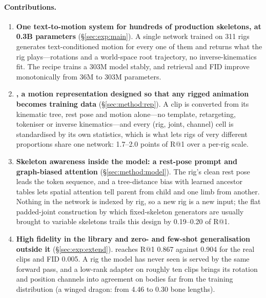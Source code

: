 \paragraph{Contributions.}
\begin{enumerate}[leftmargin=*,itemsep=1pt,topsep=2pt]
\item \textbf{One text-to-motion system for hundreds of production skeletons, at 0.3B parameters}
  (\S\ref{sec:exp:main}). A single network trained on \num{311} rigs generates text-conditioned motion for
  every one of them and returns what the rig plays---rotations and a world-space root trajectory, no
  inverse-kinematics fit. The recipe trains a \num{303}M model stably, and retrieval and FID improve
  monotonically from \num{36}M to \num{303}M parameters.
\item \textbf{\rep{}, a motion representation designed so that any rigged animation becomes training data}
  (\S\ref{sec:method:rep}). A clip is converted from its kinematic tree, rest pose and motion alone---no
  template, retargeting, tokeniser or inverse kinematics---and every (rig, joint, channel) cell is
  standardised by its own statistics, which is what lets rigs of very different proportions share one
  network: 1.7--2.0 points of R@1 over a per-rig scale.
\item \textbf{Skeleton awareness inside the model: a rest-pose prompt and graph-biased attention}
  (\S\ref{sec:method:model}). The rig's clean rest pose leads the token sequence, and a tree-distance bias
  with learned ancestor tables lets spatial attention tell parent from child and one limb from another.
  Nothing in the network is indexed by rig, so a new rig is a new input; the flat padded-joint construction
  by which fixed-skeleton generators are usually brought to variable skeletons trails this design by
  0.19--0.20 of R@1.
\item \textbf{High fidelity in the library and zero- and few-shot generalisation outside it}
  (\S\ref{sec:exp:extend}). \method{} reaches R@1 \num{0.867} against \num{0.904} for the real clips and
  FID \num{0.005}. A rig the model has never seen is served by the same forward pass, and a low-rank adapter
  on roughly ten clips brings its rotation and position channels into agreement on bodies far from the
  training distribution (a winged dragon: from \num{4.46} to \num{0.30} bone lengths).
\end{enumerate}
